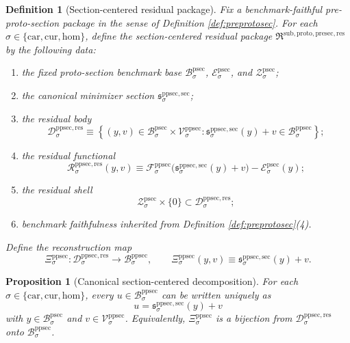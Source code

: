 \documentclass[11pt]{article}
\newcommand{\Car}{\mathrm{car}}
\newcommand{\Cur}{\mathrm{cur}}
\newcommand{\Hom}{\mathrm{hom}}
\newcommand{\ProtoSectionBody}[1]{\mathcal B_{#1}^{\mathrm{psec}}}
\newcommand{\ProtoSectionFunctional}[1]{\mathscr E_{#1}^{\mathrm{psec}}}
\newcommand{\ProtoSectionShell}[1]{\mathcal Z_{#1}^{\mathrm{psec}}}
\newcommand{\PreProtoSectionBody}[1]{\mathcal B_{#1}^{\mathrm{ppsec}}}
\newcommand{\PreProtoSectionFunctional}[1]{\mathscr F_{#1}^{\mathrm{ppsec}}}
\newcommand{\PreProtoSectionMinSection}[1]{\mathfrak s_{#1}^{\mathrm{ppsec,sec}}}
\newcommand{\PreProtoSectionVertical}[1]{\mathcal V_{#1}^{\mathrm{ppsec}}}
\newcommand{\PreProtoSectionResidualBody}[1]{\mathcal D_{#1}^{\mathrm{ppsec,res}}}
\newcommand{\PreProtoSectionResidualFunctional}[1]{\mathscr R_{#1}^{\mathrm{ppsec,res}}}
\newcommand{\PreProtoSectionResidualPackage}{\mathfrak R^{\mathrm{sub,proto,presec,res}}}
\newcommand{\PreProtoSectionNormalizer}[1]{\Xi_{#1}^{\mathrm{ppsec}}}
\newtheorem{definition}{Definition}
\newtheorem{proposition}{Proposition}
\begin{document}
\begin{definition}[Section-centered residual package]
\label{def:residual}
Fix a benchmark-faithful pre-proto-section package in the sense of Definition \ref{def:preprotosec}. For each \(\sigma\in\{\Car,\Cur,\Hom\}\), define the \emph{section-centered residual package} \(\PreProtoSectionResidualPackage\) by the following data:
\begin{enumerate}
    \item the fixed proto-section benchmark base \(\ProtoSectionBody{\sigma}\), \(\ProtoSectionFunctional{\sigma}\), and \(\ProtoSectionShell{\sigma}\);
    \item the canonical minimizer section \(\PreProtoSectionMinSection{\sigma}\);
    \item the residual body
    \[
    \PreProtoSectionResidualBody{\sigma}
    \equiv
    \left\{
    (y,v)\in\ProtoSectionBody{\sigma}\times\PreProtoSectionVertical{\sigma}:
    \PreProtoSectionMinSection{\sigma}(y)+v\in\PreProtoSectionBody{\sigma}
    \right\};
    \]
    \item the residual functional
    \[
    \PreProtoSectionResidualFunctional{\sigma}(y,v)
    \equiv
    \PreProtoSectionFunctional{\sigma}\bigl(\PreProtoSectionMinSection{\sigma}(y)+v\bigr)
    -
    \ProtoSectionFunctional{\sigma}(y);
    \]
    \item the residual shell
    \[
    \ProtoSectionShell{\sigma}\times\{0\}
    \subset
    \PreProtoSectionResidualBody{\sigma};
    \]
    \item benchmark faithfulness inherited from Definition \ref{def:preprotosec}(4).
\end{enumerate}
Define the reconstruction map
\[
\PreProtoSectionNormalizer{\sigma}:
\PreProtoSectionResidualBody{\sigma}\to\PreProtoSectionBody{\sigma},
\qquad
\PreProtoSectionNormalizer{\sigma}(y,v)
\equiv
\PreProtoSectionMinSection{\sigma}(y)+v.
\]
\end{definition}

\begin{proposition}[Canonical section-centered decomposition]
\label{prop:decomp}
For each \(\sigma\in\{\Car,\Cur,\Hom\}\), every \(u\in\PreProtoSectionBody{\sigma}\) can be written uniquely as
\[
u=\PreProtoSectionMinSection{\sigma}(y)+v
\]
with \(y\in\ProtoSectionBody{\sigma}\) and \(v\in\PreProtoSectionVertical{\sigma}\). Equivalently, \(\PreProtoSectionNormalizer{\sigma}\) is a bijection from \(\PreProtoSectionResidualBody{\sigma}\) onto \(\PreProtoSectionBody{\sigma}\).
\end{proposition}
\end{document}
